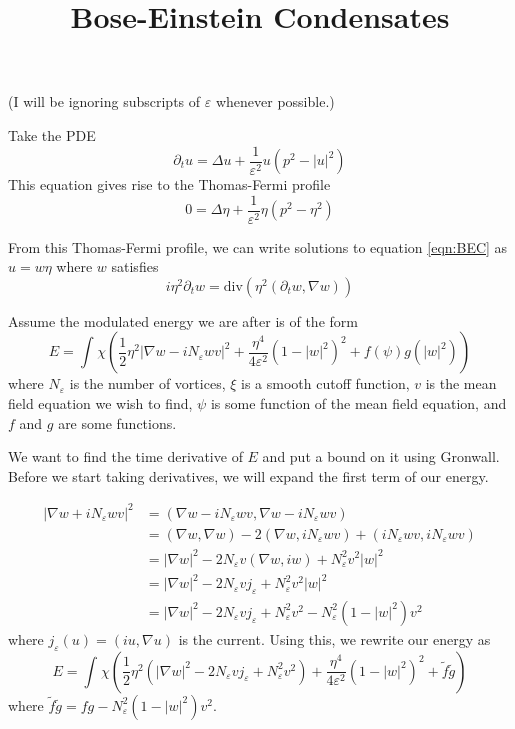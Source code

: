 \documentclass[a4paper]{article}
\title{Bose-Einstein Condensates }
\date{}
\author{}
\renewcommand{\div}{\mathrm{div}}
\begin{document}
\maketitle

(I will be ignoring subscripts of $\varepsilon$ whenever possible.)

Take the PDE
\begin{equation} \label{eqn:BEC}
  \partial_t u = \Delta u + \frac{1}{\varepsilon^2}u (p^2 - |u|^2)
\end{equation}
This equation gives rise to the Thomas-Fermi profile
\begin{equation} \label{eqn:TF}
  0 = \Delta \eta + \frac{1}{\varepsilon^2} \eta( p^2 - \eta^2 )
\end{equation}

From this Thomas-Fermi profile, we can write solutions to equation \eqref{eqn:BEC} as $u = w \eta$ where $w$ satisfies
\begin{equation} \label{eqn:w}
  i \eta^2 \partial_t w = \div (\eta^2 (\partial_t w, \nabla w))
\end{equation}

Assume the modulated energy we are after is of the form
\begin{equation} \label{eqn:energy_form_primitive}
  E = \int_{}^{} \chi \left( \frac{1}{2} \eta^2 |\nabla w - i N_\varepsilon w v|^2 + \frac{\eta^4}{4 \varepsilon^2} ( 1 - |w|^2)^2 + f(\psi) g(|w|^2) \right)
\end{equation}
where $N_\varepsilon$ is the number of vortices, $\xi$ is a smooth cutoff function, $v$ is the mean field equation we wish to find, $\psi$ is some
function of the mean field equation, and $f$ and $g$ are some functions.

We want to find the time derivative of $E$ and put a bound on it using Gronwall.
Before we start taking derivatives, we will expand the first term of our energy.

\begin{align*}
  |\nabla w + iN_\varepsilon w v|^2 &= ( \nabla w - iN_\varepsilon w v , \nabla w - iN_\varepsilon w v ) \\
  &= (\nabla w, \nabla w ) - 2 ( \nabla w, iN_\varepsilon w v ) + ( i N_\varepsilon w v, i N_\varepsilon w v ) \\
  &= | \nabla w |^2 - 2 N_\varepsilon v ( \nabla w, iw ) + N_\varepsilon^2 v^2 |w|^2 \\
  &= | \nabla w |^2 - 2 N_\varepsilon v j_\varepsilon + N_\varepsilon^2 v^2 |w|^2 \\
  &= | \nabla w |^2 - 2 N_\varepsilon v j_\varepsilon + N_\varepsilon^2 v^2 - N_\varepsilon^2 ( 1 - |w|^2 )v^2
\end{align*}
where $j_\varepsilon(u) = (iu, \nabla u)$ is the current.
Using this, we rewrite our energy as
\begin{equation} \label{eqn:energy_form}
  E = \int_{}^{} \chi \left( \frac{1}{2} \eta^2 \left( | \nabla w |^2 - 2 N_\varepsilon v j_\varepsilon + N_\varepsilon^2 v^2
  \right) + \frac{\eta^4}{4 \varepsilon^2} ( 1 - |w|^2)^2 + \tilde{f} \tilde{g} \right)
\end{equation}
where $\tilde{f} \tilde{g} = fg - N_\varepsilon^2 (1 - |w|^2) v^2$.
\end{document}
